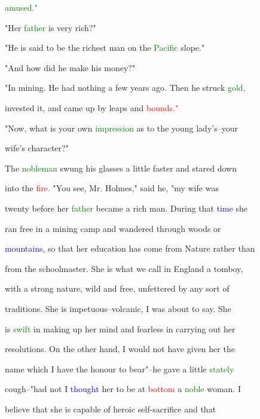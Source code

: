  \textcolor{green}{amused."}



 "Her \textcolor{green}{father} is very rich?"



 "He is said to be the richest man on the \textcolor{green}{Pacific} slope."



 "And how did he make his \textcolor{BurntOrange}{money?"}



 "In mining. He had nothing a few years ago. Then he struck \textcolor{green}{gold,}

 invested it, and came up by leaps and \textcolor{red}{bounds."}



 "Now, what is your own \textcolor{green}{impression} as to the \textcolor{BurntOrange}{young} lady's--your

 wife's character?"



 The \textcolor{green}{nobleman} swung his glasses a little faster and \textcolor{BurntOrange}{stared} down

 into the \textcolor{red}{fire.} "You see, Mr. Holmes," said he, "my wife was

 twenty before her \textcolor{green}{father} became a rich man. During that \textcolor{blue}{time} she

 ran free in a mining camp and wandered through woods or

 \textcolor{blue}{mountains,} so that her education has come from Nature rather than

 from the schoolmaster. She is what we call in England a tomboy,

 with a strong nature, \textcolor{BurntOrange}{wild} and free, unfettered by any sort of

 traditions. She is impetuous--volcanic, I was about to say. She

 is \textcolor{green}{swift} in making up her mind and \textcolor{BurntOrange}{fearless} in carrying out her

 resolutions. On the other hand, I would not have given her the

 name which I have the honour to bear"--he gave a little \textcolor{green}{stately}

 cough--"had not I \textcolor{blue}{thought} her to be at \textcolor{red}{bottom} a \textcolor{green}{noble} woman. I

 believe that she is capable of \textcolor{BurntOrange}{heroic} self-sacrifice and that

